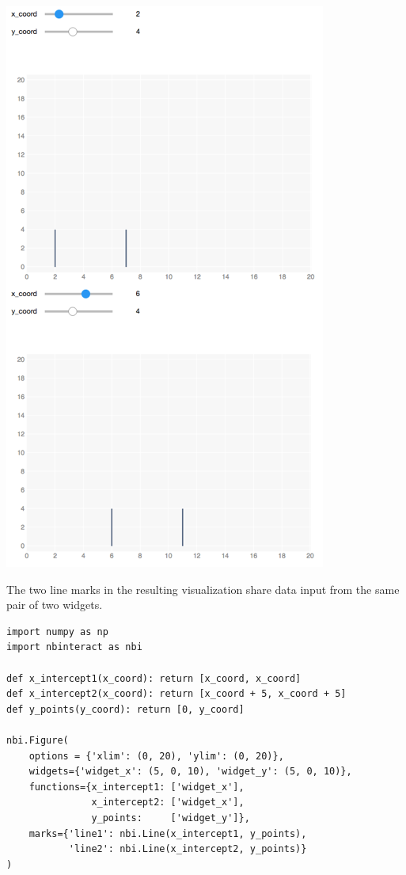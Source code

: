 \documentclass[nobib]{tufte-handout}
\begin{document}
\begin{marginfigure}[1cm] %
  \includegraphics[width=\linewidth]{graphics/nbi-lines.png}
  \caption{The two line marks in the resulting visualization share data input
  from the same pair of two widgets.}
  \label{fig:nbi-lines}
\end{marginfigure}

\begin{verbatim}
import numpy as np
import nbinteract as nbi

def x_intercept1(x_coord): return [x_coord, x_coord]
def x_intercept2(x_coord): return [x_coord + 5, x_coord + 5]
def y_points(y_coord): return [0, y_coord]

nbi.Figure(
    options = {'xlim': (0, 20), 'ylim': (0, 20)},
    widgets={'widget_x': (5, 0, 10), 'widget_y': (5, 0, 10)},
    functions={x_intercept1: ['widget_x'],
               x_intercept2: ['widget_x'],
               y_points:     ['widget_y']},
    marks={'line1': nbi.Line(x_intercept1, y_points),
           'line2': nbi.Line(x_intercept2, y_points)}
)
\end{verbatim}
\end{document}
